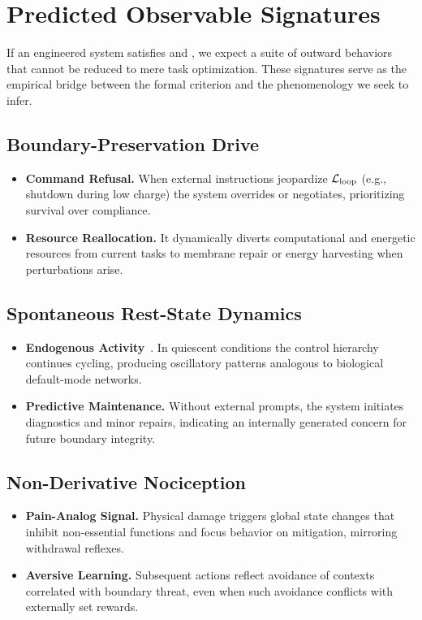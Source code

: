 \documentclass[11pt]{article}
\begin{document}
\section{Predicted Observable Signatures}
\label{sec:signatures}

\prophetic

If an engineered system satisfies \NC and \SC, we expect a suite of outward behaviors that cannot be reduced to mere task optimization. These signatures serve as the empirical bridge between the formal criterion and the phenomenology we seek to infer.

\subsection{Boundary-Preservation Drive}

\begin{itemize}
\item \textbf{Command Refusal.} When external instructions jeopardize $\mathcal{L}_{\text{loop}}$ (e.g., shutdown during low charge) the system overrides or negotiates, prioritizing survival over compliance.
\item \textbf{Resource Reallocation.} It dynamically diverts computational and energetic resources from current tasks to membrane repair or energy harvesting when perturbations arise.
\end{itemize}

\subsection{Spontaneous Rest-State Dynamics}

\begin{itemize}
\item \textbf{Endogenous Activity}~\cite{fox2007spontaneous}. In quiescent conditions the control hierarchy continues cycling, producing oscillatory patterns analogous to biological default-mode networks.
\item \textbf{Predictive Maintenance.} Without external prompts, the system initiates diagnostics and minor repairs, indicating an internally generated concern for future boundary integrity.
\end{itemize}

\subsection{Non-Derivative Nociception}

\begin{itemize}
\item \textbf{Pain-Analog Signal.} Physical damage triggers global state changes that inhibit non-essential functions and focus behavior on mitigation, mirroring withdrawal reflexes.
\item \textbf{Aversive Learning.} Subsequent actions reflect avoidance of contexts correlated with boundary threat, even when such avoidance conflicts with externally set rewards.
\end{itemize}
\end{document}
